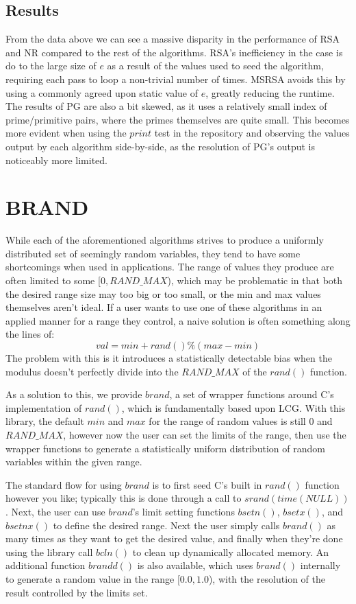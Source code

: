 \documentclass[12pt,letter,notitlepage]{article}
\begin{document}
\subsection{Results}

From the data above we can see a massive disparity in the performance of RSA and NR compared to the rest of the algorithms. RSA's inefficiency in the case is do to the large size of $e$ as a result of the values used to seed the algorithm, requiring each pass to loop a non-trivial number of times. MSRSA avoids this by using a commonly agreed upon static value of $e$, greatly reducing the runtime. The results of PG are also a bit skewed, as it uses a relatively small index of prime/primitive pairs, where the primes themselves are quite small. This becomes more evident when using the $print$ test in the repository and observing the values output by each algorithm side-by-side, as the resolution of PG's output is noticeably more limited.

\section{BRAND}

While each of the aforementioned algorithms strives to produce a uniformly distributed set of seemingly random variables, they tend to have some shortcomings when used in applications. The range of values they produce are often limited to some {[}$0, RAND\_MAX${)}, which may be problematic in that both the desired range size may too big or too small, or the min and max values themselves aren't ideal. If a user wants to use one of these algorithms in an applied manner for a range they control, a naive solution is often something along the lines of:
\[val = min + rand() \% (max - min)\]
The problem with this is it introduces a statistically detectable bias when the modulus doesn't perfectly divide into the $RAND\_MAX$ of the $rand()$ function.

As a solution to this, we provide $brand$, a set of wrapper functions around C's implementation of $rand()$, which is fundamentally based upon LCG. With this library, the default $min$ and $max$ for the range of random values is still $0$ and $RAND\_MAX$, however now the user can set the limits of the range, then use the wrapper functions to generate a statistically uniform distribution of random variables within the given range. 

The standard flow for using $brand$ is to first seed C's built in $rand()$ function however you like; typically this is done through a call to $srand(time(NULL))$. Next, the user can use $brand$'s limit setting functions $bsetn()$, $bsetx()$, and $bsetnx()$ to define the desired range. Next the user simply calls $brand()$ as many times as they want to get the desired value, and finally when they're done using the library call $bcln()$ to clean up dynamically allocated memory. An additional function $brandd()$ is also available, which uses $brand()$ internally to generate a random value in the range {[}$0.0,1.0${)}, with the resolution of the result controlled by the limits set.
\end{document}
